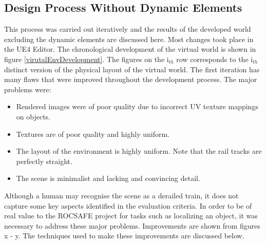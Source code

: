 \subsection{Design Process Without Dynamic Elements}
This process was carried out iteratively and the results of the developed world excluding the dynamic elements are discussed here. Most changes took place in the UE4 Editor. The chronological development of the virtual world is shown in figure \ref{virutalEnvDevelopment}. The figures on the i$_{th}$ row corresponds to the i$_{th}$ distinct version of the physical layout of the virtual world. The first iteration has many flaws that were improved throughout the development process. The major problems were:
\begin{itemize}
    \item Rendered images were of poor quality due to incorrect UV texture mappings %
    on objects.
    \item Textures are of poor quality and highly uniform.
    \item The layout of the environment is highly uniform. Note that the rail tracks are perfectly straight.
    \item The scene is minimalist and lacking and convincing detail.
\end{itemize}
Although a human may recognise the scene as a derailed train, it does not capture some key aspects identified in the evaluation criteria. In order to be of real value to the ROCSAFE project for tasks such as localizing an object, it was necessary to address these major problems. Improvements are shown from figures x - y. The techniques used to make these improvements are discussed below.


